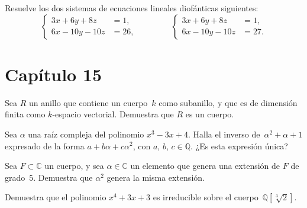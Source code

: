 \documentclass[12pt]{article}
\begin{document}
    
    \begin{exercise}
        Resuelve los dos sistemas de ecuaciones lineales diofánticas siguientes:
        \[
            \left\{
            \begin{aligned}
                3x+6y+8z&=1,\\
                6x-10y-10z&=26,
            \end{aligned}
            \right.
            \qquad\qquad
            \left\{
            \begin{aligned}
                3x+6y+8z&=1,\\
                6x-10y-10z&=27.
            \end{aligned}
            \right.
        \]
    \end{exercise}
    
    
    
    
    
    
    \section*{Capítulo 15} %
    \label{sec:capitulo_15}
    
    \begin{exercise}[15.1.1]
        Sea $R$ un anillo que contiene un cuerpo~$k$ como subanillo, y que es de dimensión finita como $k$-espacio vectorial. Demuestra que $R$ es un cuerpo.
    \end{exercise}
    
    \begin{exercise}[15.2.1]
        Sea $\alpha$ una raíz compleja del polinomio $x^{3}-3x+4$. Halla el inverso de~$\alpha^{2}+\alpha+1$ expresado de la forma $a+b \alpha+c \alpha^{2}$, con $a$, $b$, $c\in \mathbb{Q}$. ¿Es esta expresión única?
    \end{exercise}
    
    \begin{exercise}[15.3.1]
        Sea $F\subset\mathbb{C}$ un cuerpo, y sea $\alpha\in \mathbb{C}$ un elemento que genera una extensión de $F$ de grado~$5$. Demuestra que $\alpha^{2}$ genera la misma extensión.
    \end{exercise}
    
    \begin{exercise}[15.3.2]
        Demuestra que el polinomio $x^{4}+3x+3$ es irreducible sobre el cuerpo~$\mathbb{Q}[\sqrt[3]{2}]$.
    \end{exercise}
    
\end{document}
